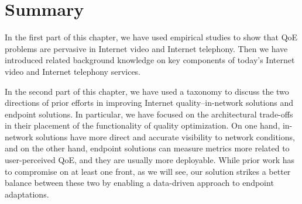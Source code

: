 


%
%
%
%


\section{Summary}

In the first part of this chapter, we have used empirical studies 
to show that QoE problems are pervasive in Internet video and Internet 
telephony. Then we have introduced 
related background knowledge on key components of today's 
Internet video and Internet telephony services.

In the second part of this chapter, we have used a taxonomy
to discuss the two directions of prior efforts in improving 
Internet quality--in-network solutions and endpoint solutions.
In particular, we have focused on the architectural trade-offs
in their placement of the functionality of quality optimization.
On one hand, in-network solutions have more direct and 
accurate visibility to network conditions, and 
on the other hand, endpoint solutions can measure metrics
more related to user-perceived QoE, and they are 
usually more deployable.
While prior work has to compromise on at least one front,
as we will see, our solution strikes a better balance
between these two by enabling a data-driven approach
to endpoint adaptations.

